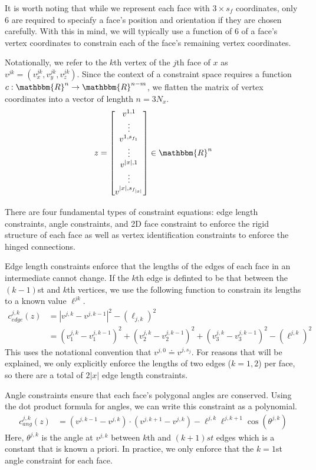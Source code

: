 It is worth noting that while we represent each face with $3\times s_f$ coordinates, only 6 are required to speciafy a face's position and orientation if they are chosen carefully. With this in mind, we will typically use a function of $6$ of a face's vertex coordinates to constrain each of the face's remaining vertex coordinates. 


Notationally, we refer to the $k$th vertex of the $j$th face of $x$ as $v^{jk} = \left(v^{jk}_x,v^{jk}_y,v^{jk}_z\right)$.
Since the context of a constraint space requires a function $c: \mathbbm{R}^n \to \mathbbm{R}^{n-m}$, we flatten the matrix of vertex coordinates into a vector of lenghth $n = 3N_x$. 
\begin{align}
z = \begin{bmatrix} v^{1,1} \\ \vdots \\ v^{1,s_{f_1}} \\ \vdots \\ v^{|x|,1} \\ \vdots \\ v^{|x|,s_{f_{|x|}}} \end{bmatrix} \in \mathbbm{R}^n
\end{align}

There are four fundamental types of constraint equations: edge length constraints, angle constraints, and 2D face constraint to enforce the rigid structure of each face as well as vertex identification constraints to enforce the hinged connections.

Edge length constraints enforce that the lengths of the edges of each face in an intermediate cannot change. If the $k$th edge is definted to be that between the $(k-1)$st and $k$th vertices, we use the following function to constrain its lengths to a known value $\ell^{jk}$.
\begin{align}
c_{edge}^{j,k}\left(z\right)& = \left|v^{j,k} - v^{j,k-1}\right|^2 - (\ell_{j,k})^2 \\
& = \left(v_1^{j,k} - v_1^{j,k-1}\right)^2 +\left(v_2^{j,k} - v_2^{j,k-1}\right)^2 +\left(v_3^{j,k} - v_3^{j,k-1}\right)^2 - (\ell^{j,k})^2 
\end{align}  
This uses the notational convention that $v^{j,0} \doteq v^{j,s_j}$. For reasons that will be explained, we only explicitly enforce the lengths of two edges ($k=1,2$) per face, so there are a total of $2|x|$ edge length constraints. 

Angle constraints ensure that each face's polygonal angles are conserved. Using the dot product formula for angles, we can write this constraint as a polynomial.
\begin{align}
c_{ang}^{j,k}\left(z\right) &= (v^{j,k-1} - v^{j,k})\cdot(v^{j,k+1} - v^{j,k})  - \ell^{j,k}\ell^{j,k+1}\cos(\theta^{j,k})
\end{align}  
Here, $\theta^{j,k}$ is the angle at $v^{j,k}$ between $k$th and $(k+1)st$ edges which is a constant that is known a priori. In practice, we only enforce that the $k=1$st angle constraint for each face.

